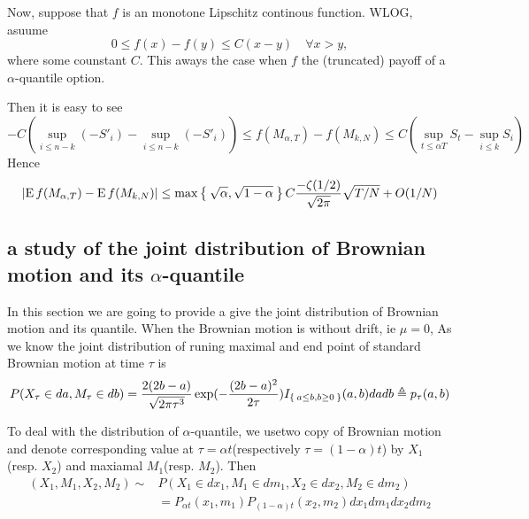 \documentclass[11pt]{book}
\def\abs#1{{\left|#1\right|}}
\def\E{{\mathrm{E}\,}}
\begin{document}
Now, suppose that $f$ is an monotone Lipschitz continous function.
WLOG, asuume
\begin{equation}\label{eq:lips}
0 \leq f(x)-f(y) \leq C (x-y) \quad \forall x>y,
\end{equation}
where some counstant $C$. This aways the case when $f$ the
(truncated) payoff of a $\alpha$-quantile option.

Then it is easy to see
\[
-C\left( \sup_{i\leq n-k} (-S'_i)-\sup_{i\leq n-k} (-S'_i)\right)
 \leq f(M_{\alpha,T}) - f(M_{k,N})
\leq  C \left(\sup_{t\leq \alpha{T}} S_t - \sup_{i\leq k} S_i\right)
\]
Hence
\[
\abs{\E f(M_{\alpha,T}) - \E f(M_{k,N})}
\leq \max\Set{\sqrt{\alpha}, \sqrt{1-\alpha}}
C\frac{-\zeta(1/2)}{\sqrt{2\pi}}\sqrt{T/N}  + O(1/N)
\]


\subsection{a study of the joint distribution of Brownian motion and its $\alpha$-quantile}
In this section we are going to provide a give the joint distribution of Brownian motion and its quantile. When the Brownian motion is without drift,
ie $\mu = 0 $,
As we know the joint distribution of runing maximal and end point of
standard Brownian motion at time $\tau$ is
\[
P(X_\tau\in da, M_\tau\in db) =
\frac{2(2b-a)}{\sqrt{2\pi \tau^3}} \exp(-\frac{(2b-a)^2}{2\tau})
I_{\Set{a\leq b, b\geq 0}} (a,b) da db \triangleq p_\tau(a,b)
\]

To deal with the distribution of $\alpha$-quantile, we usetwo copy of
Brownian motion and denote corresponding value at
$\tau=\alpha t$(respectively $\tau=(1-\alpha) t$) by $X_1$(resp. $X_2$) and
maxiamal $M_1$(resp. $M_2$).
Then
\[
\begin{split}
(X_1,M_1, X_2, M_2) \sim& P(X_1\in dx_1, M_1\in dm_1, X_2\in dx_2, M_2\in dm_2)\\
&= P_{\alpha t}(x_1, m_1) P_{(1-\alpha)t}(x_2,m_2) dx_1dm_1dx_2dm_2
\end{split}
\]
\end{document}
